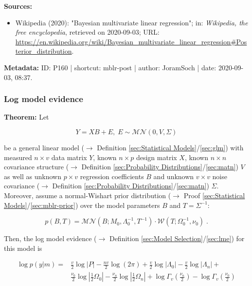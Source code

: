 \documentclass[a4paper,12pt,twoside]{book}
\begin{document}
\vspace{1em}
\textbf{Sources:}
\begin{itemize}
\item Wikipedia (2020): "Bayesian multivariate linear regression"; in: \textit{Wikipedia, the free encyclopedia}, retrieved on 2020-09-03; URL: \url{https://en.wikipedia.org/wiki/Bayesian_multivariate_linear_regression#Posterior_distribution}.
\end{itemize}


\vspace{1em}
\textbf{Metadata:} ID: P160 | shortcut: mblr-post | author: JoramSoch | date: 2020-09-03, 08:37.
\vspace{1em}



\subsubsection[\textbf{Log model evidence}]{Log model evidence} \label{sec:mblr-lme}
\setcounter{equation}{0}

\textbf{Theorem:} Let

\begin{equation} \label{eq:mblr-lme-GLM}
Y = X B + E, \; E \sim \mathcal{MN}(0, V, \Sigma)
\end{equation}

be a general linear model ($\rightarrow$ Definition \ref{sec:Statistical Models}/\ref{sec:glm}) with measured $n \times v$ data matrix $Y$, known $n \times p$ design matrix $X$, known $n \times n$ covariance structure ($\rightarrow$ Definition \ref{sec:Probability Distributions}/\ref{sec:matn}) $V$ as well as unknown $p \times v$ regression coefficients $B$ and unknown $v \times v$ noise covariance ($\rightarrow$ Definition \ref{sec:Probability Distributions}/\ref{sec:matn}) $\Sigma$. Moreover, assume a normal-Wishart prior distribution ($\rightarrow$ Proof \ref{sec:Statistical Models}/\ref{sec:mblr-prior}) over the model parameters $B$ and $T = \Sigma^{-1}$:

\begin{equation} \label{eq:mblr-lme-GLM-NW-prior}
p(B,T) = \mathcal{MN}(B; M_0, \Lambda_0^{-1}, T^{-1}) \cdot \mathcal{W}(T; \Omega_0^{-1}, \nu_0) \; .
\end{equation}

Then, the log model evidence ($\rightarrow$ Definition \ref{sec:Model Selection}/\ref{sec:lme}) for this model is

\begin{equation} \label{eq:mblr-lme-GLM-NW-LME}
\begin{split}
\log p(y|m) = & \frac{v}{2} \log |P| - \frac{nv}{2} \log (2 \pi)  + \frac{v}{2} \log |\Lambda_0| - \frac{v}{2} \log |\Lambda_n| + \\
& \frac{\nu_0}{2} \log\left| \frac{1}{2} \Omega_0 \right| - \frac{\nu_n}{2} \log\left| \frac{1}{2} \Omega_n \right| + \log \Gamma_v \left( \frac{\nu_n}{2} \right) - \log \Gamma_v \left( \frac{\nu_0}{2} \right)
\end{split}
\end{equation}
\end{document}
